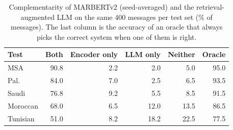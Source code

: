 \begin{table}[t]\centering\small\caption{Complementarity of MARBERTv2 (seed-averaged) and the retrieval-augmented LLM on the same 400 messages per test set (\% of messages). The last column is the accuracy of an oracle that always picks the correct system when one of them is right.}\label{tab:complement}
\begin{tabular}{lrrrrr}\toprule
Test & Both & Encoder only & LLM only & Neither & Oracle \\\midrule
MSA & 90.8 & 2.2 & 2.0 & 5.0 & 95.0 \\
Pal. & 84.0 & 7.0 & 2.5 & 6.5 & 93.5 \\
Saudi & 76.8 & 9.2 & 5.5 & 8.5 & 91.5 \\
Moroccan & 68.0 & 6.5 & 12.0 & 13.5 & 86.5 \\
Tunisian & 51.0 & 8.2 & 18.2 & 22.5 & 77.5 \\
\bottomrule\end{tabular}\end{table}
